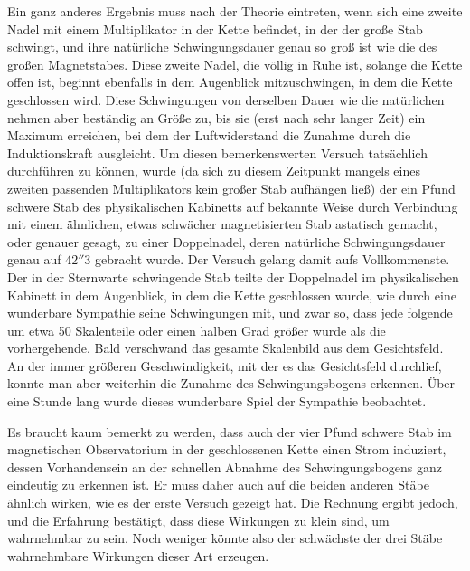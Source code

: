 Ein ganz anderes Ergebnis muss nach der Theorie eintreten, wenn sich eine zweite Nadel mit einem Multiplikator in der Kette befindet, in der der große Stab schwingt, und ihre natürliche Schwingungsdauer genau so groß ist wie die des großen Magnetstabes. Diese zweite Nadel, die völlig in Ruhe ist,
solange die Kette offen ist, beginnt ebenfalls in dem Augenblick mitzuschwingen, in dem die Kette geschlossen wird. Diese Schwingungen von derselben Dauer wie die natürlichen nehmen aber beständig an Größe zu, bis sie (erst nach sehr langer Zeit) ein Maximum erreichen, bei dem der Luftwiderstand die Zunahme durch die Induktionskraft ausgleicht. Um diesen bemerkenswerten Versuch tatsächlich durchführen zu können, wurde (da sich zu diesem Zeitpunkt mangels eines zweiten passenden Multiplikators kein großer Stab aufhängen ließ) der ein Pfund schwere Stab des physikalischen Kabinetts auf bekannte Weise durch Verbindung mit einem ähnlichen, etwas schwächer magnetisierten Stab astatisch gemacht, oder genauer gesagt, zu einer Doppelnadel, deren natürliche Schwingungsdauer genau auf $42''3$ gebracht wurde. Der Versuch gelang damit aufs Vollkommenste. Der in der Sternwarte schwingende Stab teilte der Doppelnadel im physikalischen Kabinett in dem Augenblick, in dem die Kette geschlossen wurde, wie durch eine wunderbare Sympathie seine Schwingungen mit, und zwar so, dass jede folgende um etwa 50 Skalenteile oder einen halben Grad größer wurde als die vorhergehende. Bald verschwand das gesamte Skalenbild aus dem Gesichtsfeld. An der immer größeren Geschwindigkeit, mit der es das Gesichtsfeld durchlief, konnte man aber weiterhin die Zunahme des Schwingungsbogens erkennen. Über eine Stunde lang wurde dieses wunderbare Spiel der Sympathie beobachtet.

Es braucht kaum bemerkt zu werden, dass auch der vier Pfund schwere Stab im magnetischen Observatorium in der geschlossenen Kette einen Strom induziert, dessen Vorhandensein an der schnellen Abnahme des Schwingungsbogens ganz eindeutig zu erkennen ist. Er muss daher auch auf die beiden anderen Stäbe ähnlich wirken, wie es der erste Versuch gezeigt hat. Die Rechnung ergibt jedoch, und die Erfahrung bestätigt, dass diese Wirkungen zu klein sind, um wahrnehmbar zu sein. Noch weniger könnte also der schwächste der drei Stäbe wahrnehmbare Wirkungen dieser Art erzeugen.

\clearpage

